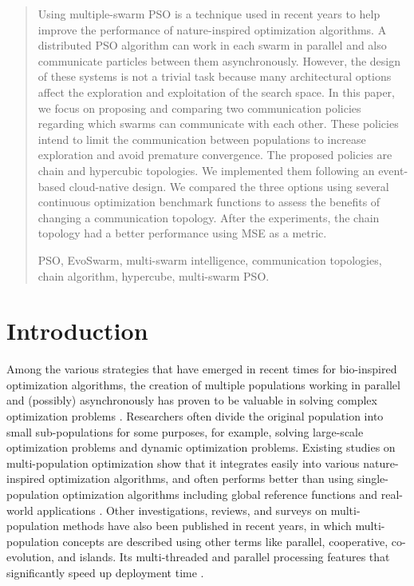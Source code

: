 \documentclass[runningheads]{llncs}
\newcommand{\keywords}[1]{\par\addvspace\baselineskip
\noindent\keywordname\enspace\ignorespaces#1}
\begin{document}
\begin{abstract}

  Using multiple-swarm PSO is a technique used in recent years to help improve
  the performance of nature-inspired optimization algorithms. A distributed PSO
  algorithm can work in each swarm in parallel and also communicate particles
  between them asynchronously. However, the design of these systems is not a
  trivial task because many architectural options affect the exploration and
  exploitation of the search space. In this paper, we focus on proposing and
  comparing two communication policies regarding which swarms can communicate
  with each other. These policies intend to limit the communication between
  populations to increase exploration and avoid premature convergence. The
  proposed policies are chain and hypercubic topologies. We implemented them
  following an event-based cloud-native design. We compared the three options
  using several continuous optimization benchmark functions to assess the
  benefits of changing a communication topology. After the experiments, the
  chain topology had a better performance using MSE as a metric.


\keywords{PSO, EvoSwarm, multi-swarm intelligence, communication topologies,
 chain algorithm, hypercube, multi-swarm PSO.}
\end{abstract}


\section{Introduction}


Among the various strategies that have emerged in recent times for bio-inspired
optimization algorithms, the creation of multiple populations working
in parallel and (possibly) asynchronously has proven to be valuable in 
solving complex optimization problems \cite{a1}.
Researchers often divide the original population into small sub-populations for some
purposes, for example, solving large-scale optimization problems and dynamic
optimization problems. Existing studies on multi-population optimization show
that it integrates easily into various nature-inspired optimization algorithms,
and often performs better than using single-population optimization algorithms
including global reference functions and real-world applications \cite{b11} \cite{b12}.
Other investigations, reviews, and surveys on multi-population methods have also
been published in recent years, in which multi-population concepts are described
using other terms like parallel, cooperative, co-evolution, and islands.
Its multi-threaded and parallel processing features that significantly speed up
deployment time \cite{b13} \cite{b14}.
\end{document}
